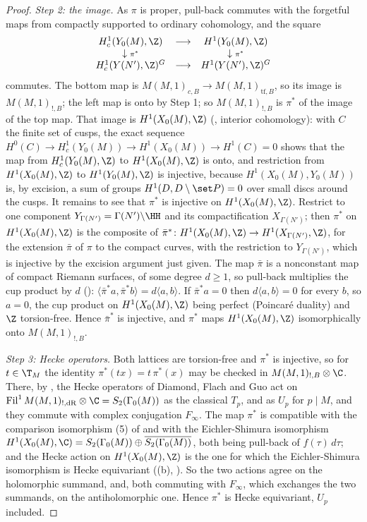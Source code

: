 \begin{proof}
\emph{Step 2: the image.} As $\pi$ is proper, pull-back commutes with the forgetful maps from compactly supported to ordinary cohomology, and the square
\[
\begin{array}{ccc}
H^1_c(Y_0(M),\Z)&\longrightarrow&H^1(Y_0(M),\Z)\\
\downarrow{\scriptstyle\pi^*}&&\downarrow{\scriptstyle\pi^*}\\
H^1_c(Y(N'),\Z)^G&\longrightarrow&H^1(Y(N'),\Z)^G
\end{array}
\]
commutes. The bottom map is $M(M,1)_{c,B}\to M(M,1)_{\mathrm{tf},B}$, so its image is $M(M,1)_{!,B}$; the left map is onto by Step 1; so $M(M,1)_{!,B}$ is $\pi^*$ of the image of the top map. That image
is $H^1(X_0(M),\Z)$ (, interior cohomology): with $C$ the finite set of cusps, the exact sequence $H^0(C)\to H^1_c(Y_0(M))\to H^1(X_0(M))\to H^1(C)=0$ shows that
the map from $H^1_c(Y_0(M),\Z)$ to $H^1(X_0(M),\Z)$ is onto, and restriction from $H^1(X_0(M),\Z)$ to $H^1(Y_0(M),\Z)$ is injective, because $H^1(X_0(M),Y_0(M))$ is, by excision, a sum of groups $H^1(D,D\setminus\set P)=0$ over small
discs around the cusps. It remains to see that $\pi^*$ is injective on $H^1(X_0(M),\Z)$. Restrict to one component $Y_{\Gamma(N')}=\Gamma(N')\backslash\HH$ and its compactification $X_{\Gamma(N')}$; then
$\pi^*$ on $H^1(X_0(M),\Z)$ is the composite of $\bar\pi^*\colon H^1(X_0(M),\Z)\to H^1(X_{\Gamma(N')},\Z)$, for the extension $\bar\pi$ of $\pi$ to the compact curves, with the restriction to $Y_{\Gamma(N')}$, which
is injective by the excision argument just given. The map $\bar\pi$ is a nonconstant map of compact Riemann surfaces, of some degree $d\ge1$, so pull-back multiplies the cup product by $d$
(): $\langle\bar\pi^*a,\bar\pi^*b\rangle=d\langle a,b\rangle$. If $\bar\pi^*a=0$ then $d\langle a,b\rangle=0$ for every $b$, so $a=0$, the cup product on $H^1(X_0(M),\Z)$ being perfect
(Poincar\'e duality) and $\Z$ torsion-free. Hence $\bar\pi^*$ is injective, and $\pi^*$ maps $H^1(X_0(M),\Z)$ isomorphically
onto $M(M,1)_{!,B}$.

\emph{Step 3: Hecke operators.} Both lattices are torsion-free and $\pi^*$ is injective, so for $t\in\T_M$ the identity $\pi^*(tx)=t\,\pi^*(x)$ may be checked in $M(M,1)_{!,B}\otimes\C$. There, by
\cite[Proposition 1.3]{DFG04}, the Hecke operators of Diamond, Flach and Guo act on $\operatorname{Fil}^1M(M,1)_{!,\mathrm{dR}}\otimes\C=S_2(\Gamma_0(M))$ as the classical $T_p$, and as $U_p$ for $p\mid M$, and
they commute with complex conjugation $F_\infty$. The map $\pi^*$ is compatible with the comparison isomorphism (5) of \cite{DFG04} and with the Eichler-Shimura isomorphism
$H^1(X_0(M),\C)=S_2(\Gamma_0(M))\oplus\overline{S_2(\Gamma_0(M))}$, both being pull-back of $f(\tau)\,d\tau$; and the Hecke action on $H^1(X_0(M),\Z)$ is the one for which the Eichler-Shimura isomorphism is
Hecke equivariant ((b), ). So the two actions agree on the holomorphic summand, and, both commuting with $F_\infty$, which exchanges the two summands,
on the antiholomorphic one. Hence $\pi^*$ is Hecke equivariant, $U_p$ included.


\end{proof}
